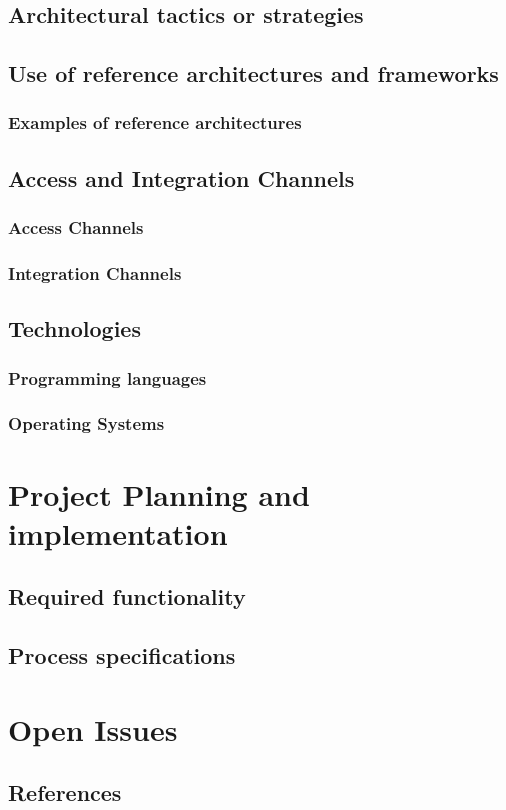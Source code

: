 \documentclass[a4paper,12pt]{article}
\begin{document}
\subsection{Architectural tactics or strategies}

\newpage
\subsection{Use of reference architectures and frameworks}
\subsubsection{Examples of reference architectures}

\subsection{Access and Integration Channels}
\subsubsection{Access Channels}
\subsubsection{Integration Channels}

\newpage
\subsection{Technologies}	
	\subsubsection{Programming languages}
	
	\subsubsection{Operating Systems}
\newpage
\section{Project Planning and implementation}
	
\subsection{Required functionality}

\subsection{Process specifications}

\newpage
\section{Open Issues}

\subsection{References}
\end{document}
